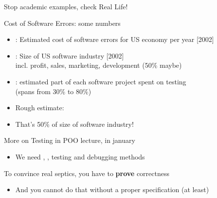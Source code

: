 \begin{frame}{Stop academic examples, check Real Life!}
  \begin{block}{Cost of Software Errors: some numbers}
    \begin{itemize}
    \item {}: Estimated cost of software errors for US
      economy per year [2002]
    \item {}: Size of US software industry [2002]\\
      {\small incl. profit, sales, marketing, development (50\% maybe)}
    \item {}: estimated part of each software project spent on
      testing\\ 
      {\small(spans from 30\% to 80\%)}

    \item Rough estimate: 
    \item That's \alert{50\% of size of software industry!}
    \end{itemize}
  \end{block}

 \begin{block}{More on Testing in POO lecture, in january}
   \begin{itemize}
   \item We need , ,  \alert{testing} and \alert{debugging} methods
   \end{itemize}
 \end{block}
  
 \begin{block}{To convince real septics, you have to \textbf{prove} correctness}
   \begin{itemize}
   \item And you cannot do that without a proper specification (at least)
   \end{itemize}
 \end{block}
\end{frame}

